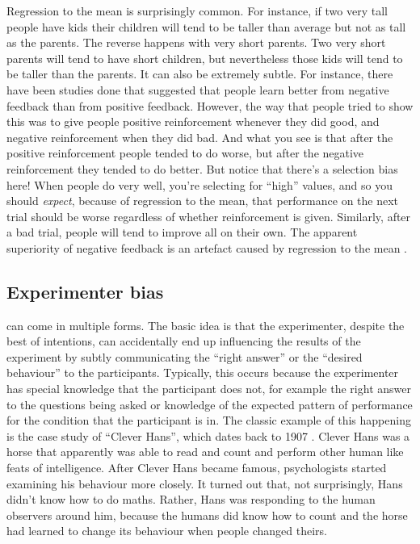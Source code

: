 Regression to the mean is surprisingly common. For instance, if two very tall people have kids their children will tend to be taller than average but not as tall as the parents. The reverse happens with very short parents. Two very short parents will tend to have short children, but nevertheless those kids will tend to be taller than the parents. It can also be extremely subtle. For instance, there have been studies done that suggested that people learn better from negative feedback than from positive feedback. However, the way that people tried to show this was to give people positive reinforcement whenever they did good, and negative reinforcement when they did bad. And what you see is that after the positive reinforcement people tended to do worse, but after the negative reinforcement they tended to do better. But notice that there's a selection bias here! When people do very well, you're selecting for ``high'' values, and so you should {\it expect}, because of regression to the mean, that performance on the next trial should be worse regardless of whether reinforcement is given. Similarly, after a bad trial, people will tend to improve all on their own. The apparent superiority of negative feedback is an artefact caused by regression to the mean \parencite[see][for discussion]{Kahneman1973}.

\subsection{Experimenter bias}

 can come in multiple forms. The basic idea is that the experimenter, despite the best of intentions, can accidentally end up influencing the results of the experiment by subtly communicating the ``right answer'' or the ``desired behaviour'' to the participants. Typically, this occurs because the experimenter has special knowledge that the participant does not, for example the right answer to the questions being asked or knowledge of the expected pattern of performance for the condition that the participant is in. The classic example of this happening is the case study of ``Clever Hans'', which dates back to 1907 \parencite{Pfungst1911,Hothersall2004}. Clever Hans was a horse that apparently was able to read and count and perform other human like feats of intelligence. After Clever Hans became famous, psychologists started examining his behaviour more closely. It turned out that, not surprisingly, Hans didn't know how to do maths. Rather, Hans was responding to the human observers around him, because the humans did know how to count and the horse had learned to change its behaviour when people changed theirs. 

